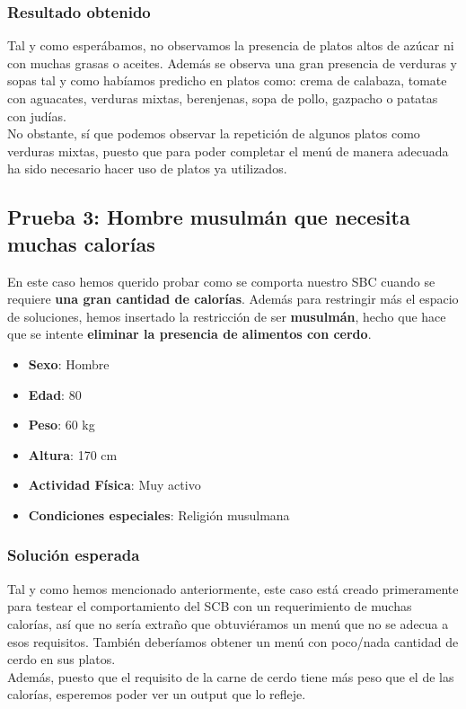 \documentclass[11]{article}
\begin{document}
\subsubsection{Resultado obtenido}

Tal y como esperábamos, no observamos la presencia de platos altos de azúcar ni con muchas grasas o aceites. Además se observa una gran presencia de verduras y sopas tal y como habíamos predicho en platos como: crema de calabaza, tomate con aguacates, verduras mixtas, berenjenas, sopa de pollo, gazpacho o patatas con judías. 
\\
No obstante, sí que podemos observar la repetición de algunos platos como verduras mixtas, puesto que para poder completar el menú de manera adecuada ha sido necesario hacer uso de platos ya utilizados. 

\subsection{Prueba 3: Hombre musulmán que necesita muchas calorías}
En este caso hemos querido probar como se comporta nuestro SBC cuando se requiere \textbf{una gran cantidad de calorías}. Además para restringir más el espacio de soluciones, hemos insertado la restricción de ser \textbf{musulmán}, hecho que hace que se intente \textbf{eliminar la presencia de alimentos con cerdo}. 

\begin{itemize}
\item \textbf{Sexo}: Hombre
\item \textbf{Edad}: 80
\item \textbf{Peso}: 60 kg
\item \textbf{Altura}: 170 cm
\item \textbf{Actividad Física}: Muy activo
\item \textbf{Condiciones especiales}: Religión musulmana
\end{itemize}

\subsubsection{Solución esperada}
Tal y como hemos mencionado anteriormente, este caso está creado primeramente para testear el comportamiento del SCB con un requerimiento de muchas calorías, así que no sería extraño que obtuviéramos un menú que no se adecua a esos requisitos. También deberíamos obtener un menú con poco/nada cantidad de cerdo en sus platos. 
\\
Además, puesto que el requisito de la carne de cerdo tiene más peso que el de las calorías, esperemos poder ver un output que lo refleje. 
\end{document}
